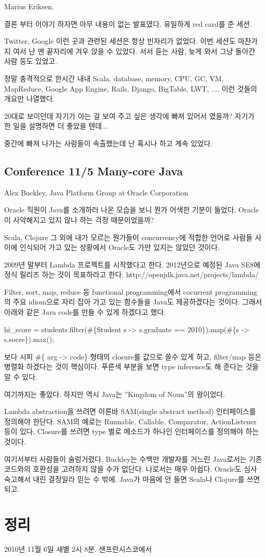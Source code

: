 \documentclass[a4paper]{article}
\begin{document}
Marius Eriksen. 
 
결론 부터 이야기 하자면 아무 내용이 없는 발표였다. 유일하게 red card를 준 세션.
 
Twitter, Google  이런 곳과 관련된 세션은 항상 빈자리가 없었다. 이번 세션도 마찬가지 여서 난 맨 끝자리에 겨우 앉을 수 있었다. 서서 듣는 사람, 늦게 와서 그냥 돌아간 사람 등도 있었고.
 
정말 충격적으로 한시간 내내 Scala, database, memory, CPU, GC, VM, MapReduce, Google App Engine, Rails, Django, BigTable, LWT, .... 이런 것들의 개요만 나열했다.
 
20대로 보이던데 자기가 아는 걸 보여 주고 싶은 생각에 빠져 있어서 였을까? 자기가 한 일을 설명하면 더 좋았을 텐데... 
 
중간에 빠져 나가는 사람들이 속출했는데 난 혹시나 하고 계속 있었다. 
 
\subsection{Conference 11/5 Many-core Java}
 
Alex Buckley, Java Platform Group at Oracle Corporation
 
Oracle 직원이 Java를 소개하러 나온 모습을 보니 뭔가 어색한 기분이 들었다. Oracle이 사악해지고 있지 않나 하는 걱정 때문이었을까?
 
Scala, Clojure 그 외에 내가 모르는 뭔가들이 concurrency에 적합한 언어로 사람들 사이에 인식되어 가고 있는 상황에서 Oracle도 가만 있지는 않았던 것이다.
 
2009년 말부터 Lambda 프로젝트를 시작했다고 한다. 2012년으로 예정된 Java SE8에 정식 릴리즈 하는 것이 목표하라고 한다. 
http://openjdk.java.net/projects/lambda/
 
Filter, sort, map, reduce 등 functional programming에서 cocurrent programming의 주요 idiom으로 자리 잡아 가고 있는 함수들을 Java도 제공하겠다는 것이다. 그래서 아래와 같은 Java code를 만들 수 있게 하겠다고 했다. 
 
hi\_score = students.filter(\#\{Student s -> s.graduate == 2010\}).map(\#\{s -> s.socre\}).max();
 
보다 시피  \#\{ arg -> code\} 형태의 closure를 값으로 쓸수 있게 하고, filter/map 등은 병렬화 하겠다는 것이 핵심이다. 푸른색 부분을 보면 type inference도 해 준다는 것을 알 수 있다.
 
여기까지는 좋았다. 하지만 역시 Java는 ”Kingdom of Noun”의 왕이었다. 
 
Lambda abstraction을 쓰려면 이른바 SAM(single abstract method) 인터페이스를 정의해야 한단다.  SAM의 예로는 Runnable, Callable, Comparator, ActionListener 등이 있다. Closure를 쓰려면 type 별로 메소드가 하나인 인터페이스를 정의해야 하는 것이다.
 
여기서부터 사람들이 술렁거렸다. Buckley는 수백만 개발자를 거느린 Java로서는 기존 코드와의 호환성을 고려하지 않을 수가 없단다. 나로서는 매우 아쉽다. Oracle도 심사 숙고해서 내린 결정일라 믿는 수 밖에. Java가 마음에 안 들면 Scala나 Clojure를 쓰면 되고.

\section{정리}

2010년 11월 6일 새별 2시 8분.
샌프란시스코에서
\end{document}
